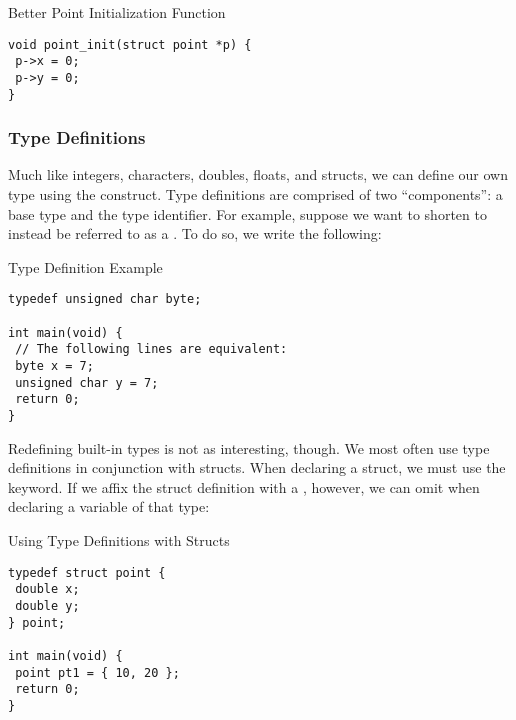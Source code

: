 \begin{cl}[main.c]{Better Point Initialization Function}
\begin{lstlisting}[language=MyC]
void point_init(struct point *p) {
 p->x = 0;
 p->y = 0;
}    
\end{lstlisting}
\end{cl}



\subsubsection*{Type Definitions}

Much like integers, characters, doubles, floats, and structs, we can define our own type using the  construct. Type definitions are comprised of two ``components'': a base type and the type identifier. For example, suppose we want to shorten  to instead be referred to as a . To do so, we write the following:

\begin{cl}[main.c]{Type Definition Example}
\begin{lstlisting}[language=MyC]
typedef unsigned char byte;

int main(void) {
 // The following lines are equivalent:
 byte x = 7;
 unsigned char y = 7;
 return 0;
}
\end{lstlisting}
\end{cl}

Redefining built-in types is not as interesting, though. We most often use type definitions in conjunction with structs. When declaring a struct, we must use the  keyword. If we affix the struct definition with a , however, we can omit  when declaring a variable of that type:

\begin{cl}[main.c]{Using Type Definitions with Structs}
\begin{lstlisting}[language=MyC]
typedef struct point {
 double x;
 double y;
} point;

int main(void) {
 point pt1 = { 10, 20 };
 return 0;
}
\end{lstlisting}
\end{cl}

